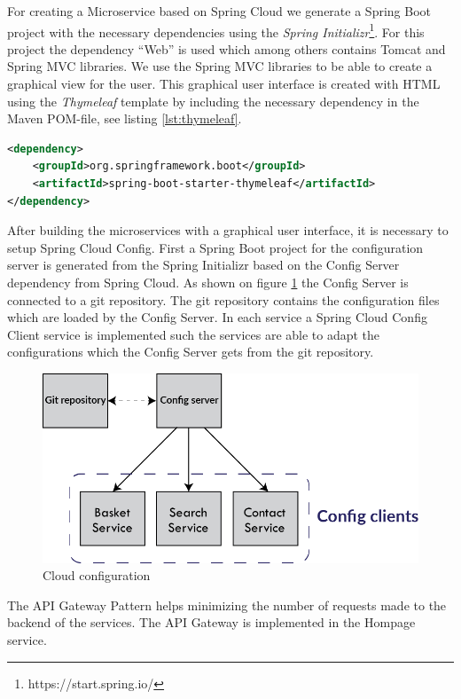 For creating a Microservice based on Spring Cloud we generate a Spring Boot project with the necessary dependencies using the \emph{Spring Initializr}\footnote{https://start.spring.io/}. For this project the dependency ``Web'' is used which among others contains Tomcat and Spring MVC libraries. We use the Spring MVC libraries to be able to create a graphical view for the user. This graphical user interface is created with HTML using the \emph{Thymeleaf} template by including the necessary dependency in the Maven POM-file, see listing \ref{lst:thymeleaf}. 
\begin{lstlisting}[caption={Thymeleaf dependency in POM-file},label={lst:thymeleaf}, language=XML, frame=single, ]
<dependency>
	<groupId>org.springframework.boot</groupId>
	<artifactId>spring-boot-starter-thymeleaf</artifactId>
</dependency>
\end{lstlisting}
After building the microservices with a graphical user interface, it is necessary to setup Spring Cloud Config.
First a Spring Boot project for the configuration server is generated from the Spring Initializr based on the Config Server dependency from Spring Cloud. As shown on figure \ref{fig:cloud-config} the Config Server is connected to a git repository. The git repository contains the configuration files which are loaded by the Config Server. In each service a Spring Cloud Config Client service is implemented such the services are able to adapt the configurations which the Config Server gets from the git repository.  
\begin{figure}[bth]
	\includegraphics[width=1\linewidth]{gfx/cloud-config}
	\caption[cloudconfig]{Cloud configuration} \label{fig:cloud-config}
\end{figure}    

The API Gateway Pattern helps minimizing the number of requests made to the backend of the services.
The API Gateway is implemented in the Hompage service.  